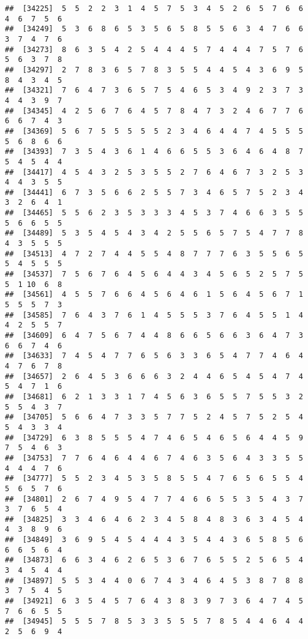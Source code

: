 \documentclass[
]{book}
\begin{document}
\begin{verbatim}
##  [34225]  5  5  2  2  3  1  4  5  7  5  3  4  5  2  6  5  7  6  6  4  6  7  5  6
##  [34249]  5  3  6  8  6  5  3  5  6  5  8  5  5  6  3  4  7  6  6  3  7  4  7  6
##  [34273]  8  6  3  5  4  2  5  4  4  4  5  7  4  4  4  7  5  7  6  5  6  3  7  8
##  [34297]  2  7  8  3  6  5  7  8  3  5  5  4  4  5  4  3  6  9  5  8  4  3  4  5
##  [34321]  7  6  4  7  3  6  5  7  5  4  6  5  3  4  9  2  3  7  3  4  4  3  9  7
##  [34345]  4  2  5  6  7  6  4  5  7  8  4  7  3  2  4  6  7  7  6  6  6  7  4  3
##  [34369]  5  6  7  5  5  5  5  5  2  3  4  6  4  4  7  4  5  5  5  5  6  8  6  6
##  [34393]  7  3  5  4  3  6  1  4  6  6  5  5  3  6  4  6  4  8  7  5  4  5  4  4
##  [34417]  4  5  4  3  2  5  3  5  5  2  7  6  4  6  7  3  2  5  3  4  4  3  5  5
##  [34441]  6  7  3  5  6  6  2  5  5  7  3  4  6  5  7  5  2  3  4  3  2  6  4  1
##  [34465]  5  5  6  2  3  5  3  3  3  4  5  3  7  4  6  6  3  5  5  5  6  6  5  5
##  [34489]  5  3  5  4  5  4  3  4  2  5  5  6  5  7  5  4  7  7  8  4  3  5  5  5
##  [34513]  4  7  2  7  4  4  5  5  4  8  7  7  7  6  3  5  5  6  5  5  4  5  5  5
##  [34537]  7  5  6  7  6  4  5  6  4  4  3  4  5  6  5  2  5  7  5  5  1 10  6  8
##  [34561]  4  5  5  7  6  6  4  5  6  4  6  1  5  6  4  5  6  7  1  5  5  5  7  3
##  [34585]  7  6  4  3  7  6  1  4  5  5  5  3  7  6  4  5  5  1  4  4  2  5  5  7
##  [34609]  6  4  7  5  6  7  4  4  8  6  6  5  6  6  3  6  4  7  3  6  6  7  4  6
##  [34633]  7  4  5  4  7  7  6  5  6  3  3  6  5  4  7  7  4  6  4  4  7  6  7  8
##  [34657]  2  6  4  5  3  6  6  6  3  2  4  4  6  5  4  5  4  7  4  5  4  7  1  6
##  [34681]  6  2  1  3  3  1  7  4  5  6  3  6  5  5  7  5  5  3  2  5  5  4  3  7
##  [34705]  5  6  6  4  7  3  3  5  7  7  5  2  4  5  7  5  2  5  4  5  4  3  3  4
##  [34729]  6  3  8  5  5  5  4  7  4  6  5  4  6  5  6  4  4  5  9  7  5  4  6  3
##  [34753]  7  7  6  4  6  4  4  6  7  4  6  3  5  6  4  3  3  5  5  4  4  4  7  6
##  [34777]  5  5  2  3  4  5  3  5  8  5  5  4  7  6  5  6  5  5  4  5  6  5  7  6
##  [34801]  2  6  7  4  9  5  4  7  7  4  6  6  5  5  3  5  4  3  7  3  7  6  5  4
##  [34825]  3  3  4  6  4  6  2  3  4  5  8  4  8  3  6  3  4  5  4  4  3  8  9  6
##  [34849]  3  6  9  5  4  5  4  4  4  3  5  4  4  3  6  5  8  5  6  6  6  5  6  4
##  [34873]  6  6  3  4  6  2  6  5  3  6  7  6  5  5  2  5  6  5  4  3  4  5  4  4
##  [34897]  5  5  3  4  4  0  6  7  4  3  4  6  4  5  3  8  7  8  8  3  7  5  4  5
##  [34921]  6  3  5  4  5  7  6  4  3  8  3  9  7  3  6  4  7  4  5  7  6  6  5  5
##  [34945]  5  5  5  7  8  5  3  3  5  5  5  7  8  5  4  4  6  4  4  2  5  6  9  4

\end{verbatim}
\end{document}
